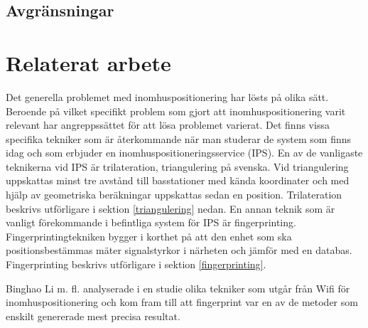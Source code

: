 \documentclass[swedish, a4paper,12pt]{article}
\begin{document}

\subsection{Avgränsningar}

\section{Relaterat arbete}
Det generella problemet med inomhuspositionering har lösts på olika sätt.
Beroende på vilket specifikt problem som gjort att inomhuspositionering varit relevant har angreppssättet för att lösa problemet varierat. Det finns vissa specifika tekniker som är återkommande när man studerar de system som finns idag och som erbjuder en inomhuspositioneringsservice (IPS)\cite{IP1}.
En av de vanligaste teknikerna vid IPS är trilateration\cite{cook2005indoor}, triangulering på svenska. Vid triangulering uppskattas minst tre avstånd till basstationer med kända koordinater och med hjälp av geometriska beräkningar uppskattas sedan en position. Trilateration beskrivs utförligare i sektion \ref{triangulering}
 nedan. En annan teknik som är vanligt förekommande i befintliga system för IPS är fingerprinting\cite{IP1}\cite{jun2018low}. Fingerprintingtekniken bygger i korthet på att den enhet som ska positionsbestämmas mäter signalstyrkor i närheten och jämför med en databas. Fingerprinting beskrivs utförligare i sektion \ref{fingerprinting}.

Binghao Li m. fl. analyserade i en studie \cite{IP1} olika tekniker som utgår från Wifi för inomhuspositionering och kom fram till att fingerprint var en av de metoder som enskilt genererade mest precisa resultat.
\end{document}
